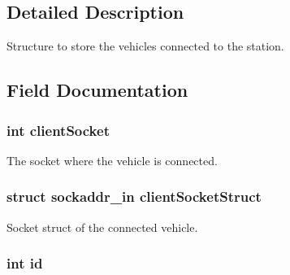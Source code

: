 \subsection{Detailed Description}
Structure to store the vehicles connected to the station. 

\subsection{Field Documentation}
\subsubsection[{\texorpdfstring{client\+Socket}{clientSocket}}]{\setlength{\rightskip}{0pt plus 5cm}int client\+Socket}\hypertarget{struct_s_a___v_e_h_i_c_l_e___d_a_t_a_adc5475d507e3d713ad405bbeb6eb41e7}{}\label{struct_s_a___v_e_h_i_c_l_e___d_a_t_a_adc5475d507e3d713ad405bbeb6eb41e7}


The socket where the vehicle is connected. 

\subsubsection[{\texorpdfstring{client\+Socket\+Struct}{clientSocketStruct}}]{\setlength{\rightskip}{0pt plus 5cm}struct sockaddr\+\_\+in client\+Socket\+Struct}\hypertarget{struct_s_a___v_e_h_i_c_l_e___d_a_t_a_a202412679559fc3de3606903af333031}{}\label{struct_s_a___v_e_h_i_c_l_e___d_a_t_a_a202412679559fc3de3606903af333031}


Socket struct of the connected vehicle. 

\subsubsection[{\texorpdfstring{id}{id}}]{\setlength{\rightskip}{0pt plus 5cm}int id}\hypertarget{struct_s_a___v_e_h_i_c_l_e___d_a_t_a_a7441ef0865bcb3db9b8064dd7375c1ea}{}\label{struct_s_a___v_e_h_i_c_l_e___d_a_t_a_a7441ef0865bcb3db9b8064dd7375c1ea}



